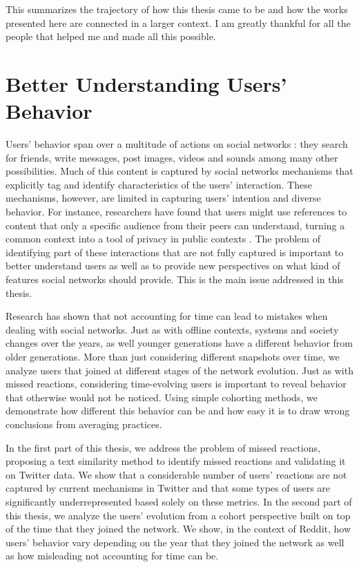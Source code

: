 This summarizes the trajectory of how this thesis came to be and how the works presented here are connected in a larger context. I am greatly thankful for all the people that helped me and made all this possible.

\section{Better Understanding Users' Behavior}

Users' behavior span over a multitude of actions on social networks \cite{Benevenuto2009, Gilbert2009, Comarela2012}: they search for friends, write messages, post images, videos and sounds among many other possibilities. Much of this content is captured by social networks mechanisms that explicitly tag and identify characteristics of the users' interaction. These mechanisms, however, are limited in capturing users' intention and diverse behavior. For instance, researchers have found that users might use references to content that only a specific audience from their peers can understand, turning a common context into a tool of privacy in public contexts \cite{Boyd2011}. The problem of identifying part of these interactions that are not fully captured is important to better understand users as well as to provide new perspectives on what kind of features social networks should provide. This is the main issue addressed in this thesis.

Research has shown that not accounting for time can lead to mistakes when dealing with social networks. Just as with offline contexts, systems and society changes over the years, as well younger generations have a different behavior from older generations. More than just considering different snapshots over time, we analyze users that joined at different stages of the network evolution. Just as with missed reactions, considering time-evolving users is important to reveal behavior that otherwise would not be noticed. Using simple cohorting methods, we demonstrate how different this behavior can be and how easy it is to draw wrong conclusions from averaging practices.

In the first part of this thesis, we address the problem of missed reactions, proposing a text similarity method to identify missed reactions and validating it on Twitter data. We show that a considerable number of users' reactions are not captured by current mechanisms in Twitter and that some types of users are significantly underrepresented based solely on these metrics. In the second part of this thesis, we analyze the users' evolution from a cohort perspective built on top of the time that they joined the network. We show, in the context of Reddit, how users' behavior vary depending on the year that they joined the network as well as how misleading not accounting for time can be. 

